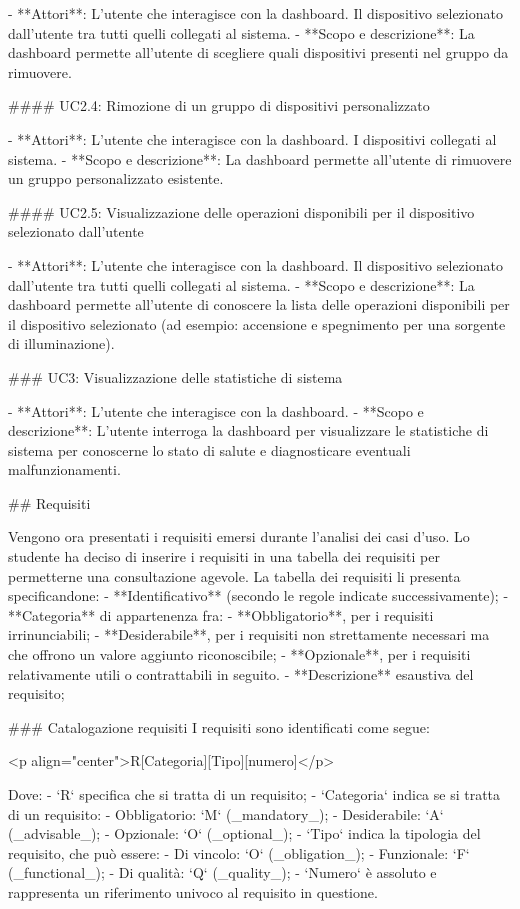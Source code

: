 -   **Attori**:  
    L'utente che interagisce con la dashboard. Il dispositivo selezionato dall'utente tra tutti quelli collegati al sistema.
-   **Scopo e descrizione**:  
    La dashboard permette all'utente di scegliere quali dispositivi presenti nel gruppo da rimuovere.

#### UC2.4: Rimozione di un gruppo di dispositivi personalizzato

-   **Attori**:  
    L'utente che interagisce con la dashboard. I dispositivi collegati al sistema.
-   **Scopo e descrizione**:  
    La dashboard permette all'utente di rimuovere un gruppo personalizzato esistente.


#### UC2.5: Visualizzazione delle operazioni disponibili per il dispositivo selezionato dall'utente

-   **Attori**:  
    L'utente che interagisce con la dashboard. Il dispositivo selezionato dall'utente tra tutti quelli collegati al sistema.
-   **Scopo e descrizione**:  
    La dashboard permette all'utente di conoscere la lista delle operazioni disponibili per il dispositivo selezionato (ad esempio: accensione e spegnimento per una sorgente di illuminazione).

### UC3: Visualizzazione delle statistiche di sistema

-   **Attori**:  
    L'utente che interagisce con la dashboard.
-   **Scopo e descrizione**:  
    L'utente interroga la dashboard per visualizzare le statistiche di sistema per conoscerne lo stato di salute e diagnosticare eventuali malfunzionamenti.


## Requisiti

Vengono ora presentati i requisiti emersi durante l’analisi dei casi d’uso. Lo studente ha deciso di inserire i requisiti in una tabella dei requisiti per permetterne una consultazione agevole.
La tabella dei requisiti li presenta specificandone:
-   **Identificativo** (secondo le regole indicate successivamente);
-   **Categoria** di appartenenza fra:
    -   **Obbligatorio**, per i requisiti irrinunciabili;
    -   **Desiderabile**, per i requisiti non strettamente necessari ma che offrono un
    valore aggiunto riconoscibile;
    -   **Opzionale**, per i requisiti relativamente utili o contrattabili in seguito.
-   **Descrizione** esaustiva del requisito;

### Catalogazione requisiti
I requisiti sono identificati come segue:

<p align="center">R[Categoria][Tipo][numero]</p>

Dove:
-   `R` specifica che si tratta di un requisito;
-   `Categoria` indica se si tratta di un requisito:
    -   Obbligatorio: `M` (_mandatory_);
    -   Desiderabile: `A` (_advisable_);
    -   Opzionale: `O` (_optional_);
-   `Tipo` indica la tipologia del requisito, che può essere:
    -   Di vincolo: `O` (_obligation_);
    -   Funzionale: `F` (_functional_);
    -   Di qualità: `Q` (_quality_);
-   `Numero` è assoluto e rappresenta un riferimento univoco al requisito in questione.


